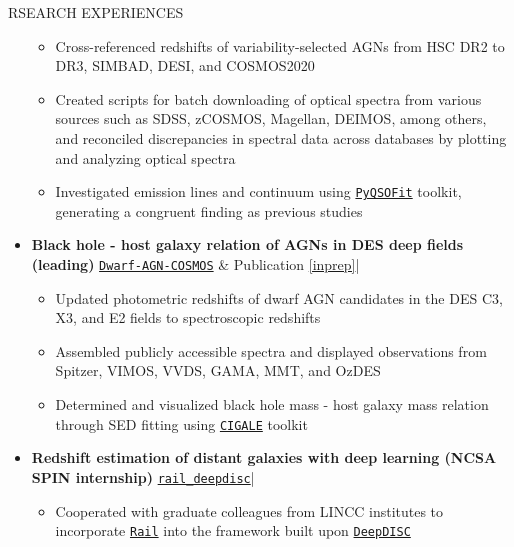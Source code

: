 \documentclass[10pt]{article} %
\begin{document}
\begin{section}{RSEARCH EXPERIENCES}
\begin{itemize}[leftmargin=1.5em]
    \begin{itemize}[leftmargin=1.5em]
        \item Cross-referenced redshifts of variability-selected AGNs from HSC DR2 to DR3, SIMBAD, DESI, and COSMOS2020
        \item Created scripts for batch downloading of optical spectra from various sources such as SDSS, zCOSMOS, Magellan, DEIMOS, among others, and reconciled discrepancies in spectral data across databases by plotting and analyzing optical spectra
        \item Investigated emission lines and continuum using \href{https://github.com/legolason/PyQSOFit}{\texttt{PyQSOFit}} toolkit, generating a congruent finding as previous studies
    \end{itemize}
    \item \textbf{Black hole - host galaxy relation of AGNs in DES deep fields (leading)} 
    \hfill {\footnotesize \href{https://github.com/burke86/dwarf_agn_cosmos}{\texttt{Dwarf-AGN-COSMOS}} \& Publication \ref{inprep}}| %
    \begin{itemize}[leftmargin=1.5em]
        \item Updated photometric redshifts of dwarf AGN candidates in the DES C3, X3, and E2 fields to spectroscopic redshifts
        \item Assembled publicly accessible spectra and displayed observations from Spitzer, VIMOS, VVDS, GAMA, MMT, and OzDES
        \item Determined and visualized black hole mass - host galaxy mass relation through SED fitting using \href{https://cigale.lam.fr/}{\texttt{CIGALE}} toolkit
    \end{itemize}
    \item \textbf{Redshift estimation of distant galaxies with deep learning (NCSA SPIN internship)} 
    \hfill {\footnotesize \href{https://github.com/LSSTDESC/rail_deepdisc}{\texttt{rail\_deepdisc}}}| %
    \begin{itemize}[leftmargin=1.5em]
        \item Cooperated with graduate colleagues from LINCC institutes to incorporate \href{https://github.com/LSSTDESC/RAIL}{\texttt{Rail}} into the framework built upon \href{https://github.com/burke86/deepdisc}{\texttt{DeepDISC}}
    \end{itemize}
\end{itemize}


\end{section}
\end{document}
